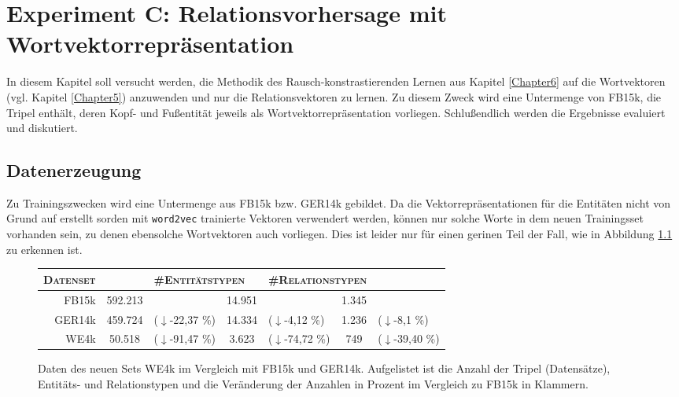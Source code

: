 
\chapter{Experiment C: Relationsvorhersage mit Wortvektorrepräsentation} %

\label{Chapter8} %


In diesem Kapitel soll versucht werden, die Methodik des Rausch-konstrastierenden Lernen aus Kapitel \ref{Chapter6}
auf die Wortvektoren (vgl. Kapitel \ref{Chapter5}) anzuwenden und nur die Relationsvektoren zu lernen. Zu diesem Zweck
wird eine Untermenge von FB15k, die Tripel enthält, deren Kopf- und Fußentität jeweils als Wortvektorrepräsentation vorliegen.
Schlußendlich werden die Ergebnisse evaluiert und diskutiert.

\section{Datenerzeugung}

Zu Trainingszwecken wird eine Untermenge aus FB15k bzw. GER14k gebildet. Da
die Vektorrepräsentationen für die Entitäten nicht von Grund auf erstellt sorden mit
\verb|word2vec| trainierte Vektoren verwendert werden, können nur solche Worte in dem
neuen Trainingsset vorhanden sein, zu denen ebensolche Wortvektoren auch vorliegen.
Dies ist leider nur für einen gerinen Teil der Fall, wie in Abbildung \ref{fig:we4k} zu
erkennen ist.

\begin{figure}[h]
  \centering
  \begin{tabular}{r||cl|cl|cl}
    \textsc{Datenset} & \multicolumn{2}{l|}{\textsc{\#Tripel}} & \multicolumn{2}{l|}{\textsc{\#Entitätstypen}} & \multicolumn{2}{l}{\textsc{\#Relationstypen}} \\
    \hline
    FB15k & 592.213 & & 14.951 & & 1.345 & \\
    GER14k & 459.724 & (\textcolor{BrickRed}{$\downarrow$-22,37 \%}) & 14.334 & (\textcolor{BrickRed}{$\downarrow$-4,12 \%}) & 1.236 & (\textcolor{BrickRed}{$\downarrow$-8,1 \%}) \\
    WE4k & 50.518 & (\textcolor{BrickRed}{$\downarrow$-91,47 \%}) & 3.623 & (\textcolor{BrickRed}{$\downarrow$-74,72 \%}) & 749 & (\textcolor{BrickRed}{$\downarrow$-39,40 \%}) \\
  \end{tabular}
  \caption[Daten des neuen Relationsdatensets im Vergleich zu FB15k und GER14k]{Daten des neuen Sets WE4k im Vergleich mit
  FB15k und GER14k. Aufgelistet ist die Anzahl der Tripel (Datensätze), Entitäts- und Relationstypen und die Veränderung
  der Anzahlen in Prozent im Vergleich zu FB15k in Klammern.\label{fig:we4k}}
\end{figure}

